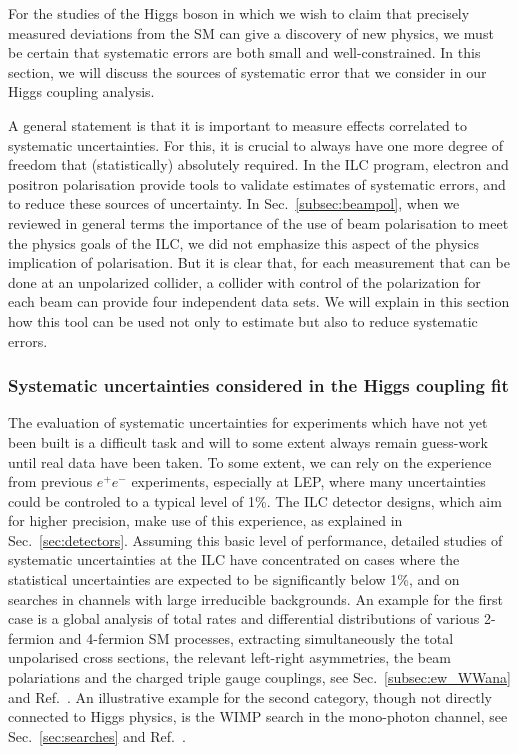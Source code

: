 
  For the studies of the Higgs boson in which we wish to claim that precisely measured deviations from the SM can give a discovery of new physics, we must be certain that systematic errors are both small and well-constrained.  In this section, we will discuss 
the sources of systematic error that we consider in our Higgs coupling analysis.

A general statement is that it is important to measure effects correlated to systematic uncertainties.  For this, it is crucial to always have one more degree of freedom that (statistically) absolutely required.  In the ILC program, electron and positron polarisation
provide tools to validate estimates of systematic errors, and to reduce these 
sources of uncertainty.  In Sec.~\ref{subsec:beampol}, when we reviewed in general terms the importance of the
 use of beam polarisation to meet the physics goals of the ILC, we did not emphasize this 
aspect of the physics implication of polarisation.  But it is clear that, for each measurement that can be done at an unpolarized collider, a collider with control of the polarization for each beam can provide four independent data sets.  We will explain in this section how this tool 
can be used not only to estimate but also to reduce systematic errors.



\subsubsection{Systematic uncertainties considered in the Higgs coupling fit}

The evaluation of systematic uncertainties for experiments which have not yet been built is a difficult task and will to some extent always remain guess-work until real data have been taken. To some extent, we can rely on the experience from previous $e^+e^-$ experiments, especially at LEP, where many uncertainties could be controled to a typical level of 1\%.
The ILC detector designs, which aim for higher precision, make use of this experience,
as explained in Sec.~\ref{sec:detectors}.  Assuming this basic level of performance, detailed studies of systematic uncertainties at the ILC have concentrated on cases where the statistical uncertainties are expected to be significantly below 1\%, and on searches in channels with large irreducible backgrounds. An example for the first case is a global analysis of total rates and differential distributions of various 2-fermion and 4-fermion SM processes, extracting simultaneously the total unpolarised cross sections, the relevant left-right asymmetries, the beam polariations and the charged triple gauge couplings, see Sec.~\ref{subsec:ew_WWana} and Ref.~\cite{bib:PhDRobert}. An illustrative example for the second category, though not directly connected to Higgs physics, is the WIMP search in the mono-photon channel, see Sec.~\ref{sec:searches} and Ref.~\cite{Habermehl:417605}. 

